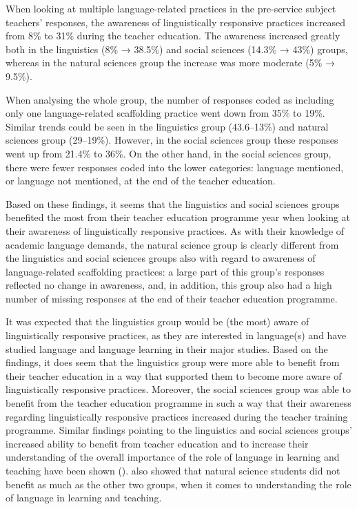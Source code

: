 \documentclass[output=paper]{langscibook}
\begin{document}
When looking at multiple language-related practices in the pre-service subject teachers’ responses, the awareness of linguistically responsive practices increased from 8\% to 31\% during the teacher education. The awareness increased greatly both in the linguistics (8\% → 38.5\%) and social sciences (14.3\% → 43\%) groups, whereas in the natural sciences group the increase was more moderate (5\% → 9.5\%). 

When analysing the whole group, the number of responses coded as including only one language-related scaffolding practice went down from 35\% to 19\%. Similar trends could be seen in the linguistics group (43.6--13\%) and natural sciences group (29--19\%). However, in the social sciences group these responses went up from 21.4\% to 36\%. On the other hand, in the social sciences group, there were fewer responses coded into the lower categories: language mentioned, or language not mentioned, at the end of the teacher education. 

Based on these findings, it seems that the linguistics and social sciences groups benefited the most from their teacher education programme year when looking at their awareness of linguistically responsive practices. As with their knowledge of academic language demands, the natural science group is clearly different from the linguistics and social sciences groups also with regard to awareness of language\hyp related scaffolding practices: a large part of this group’s responses reflected no change in awareness, and, in addition, this group also had a high number of missing responses at the end of their teacher education programme.

It was expected that the linguistics group would be (the most) aware of linguistically responsive practices, as they are interested in language(s) and have studied language and language learning in their major studies. Based on the findings, it does seem that the linguistics group were more able to benefit from their teacher education in a way that supported them to become more aware of linguistically responsive practices. Moreover, the social sciences group was able to benefit from the teacher education programme in such a way that their awareness regarding linguistically responsive practices increased during the teacher training programme. Similar findings pointing to the linguistics and social sciences groups’ increased ability to benefit from teacher education and to increase their understanding of the overall importance of the role of language in learning and teaching have been shown (\citealt{HeikkolaEtAl2021}). \citeauthor{HeikkolaEtAl2021} also showed that natural science students did not benefit as much as the other two groups, when it comes to understanding the role of language in learning and teaching.
\end{document}
